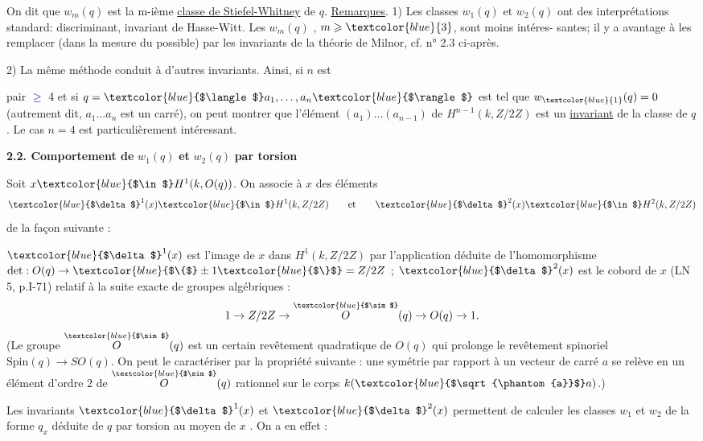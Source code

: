 \documentclass[11pt]{article}
\newcommand{\scanpage}[1]{\par\bigskip\noindent{\small\sffamily[scan #1]}\par}
\newcommand{\mspage}[1]{{\small\sffamily[p.\,#1]}}
\newcommand{\hand}[1]{\textcolor{blue}{#1}}
\newcommand{\uline}[1]{\underline{#1}}
\begin{document}
On dit que $w_m(q)$ est la m-ième \uline{classe de Stiefel-Whitney} de $q$.
\uline{Remarques}. 1) Les classes $w_1(q)$ et $w_2(q)$ ont des interprétations standard:
discriminant, invariant de Hasse-Witt. Les $w_m(q)$ , $m \geqslant \hand{3}$, sont moins intéres-%
santes; il y a avantage à les remplacer (dans la mesure du possible)
par les invariants de la théorie de Milnor, cf. n° 2.3 ci-après.

2) La même méthode conduit à d'autres invariants. Ainsi, si $n$ est

\mspage{\hand{289}}

\clearpage
\scanpage{119/290}
\mspage{- 3 -}

pair \hand{$\geq$} 4 et si $q = \hand{$\langle$} a_1,\dots,a_n \hand{$\rangle$}$ est tel que $w_{\hand{1}}(q) = 0$ (autrement dit,
$a_1\dots a_n$ est un carré), on peut montrer que l'élément $(a_1)\dots(a_{n-1})$ de
$H^{n-1}(k, Z/2Z)$ est un \uline{invariant} de la classe de $q$. Le cas $n = 4$ est
particulièrement intéressant.

\textbf{2.2. Comportement de} $w_1(q)$ \textbf{et} $w_2(q)$ \textbf{par torsion}

Soit $x \hand{$\in$} H^1(k, O(q))$. On associe à $x$ des éléments
\[ \hand{$\delta$}^1(x) \hand{$\in$} H^1(k,Z/2Z) \qquad\text{et}\qquad \hand{$\delta$}^2(x) \hand{$\in$} H^2(k,Z/2Z) \]
de la façon suivante :

$\hand{$\delta$}^1(x)$ est l'image de $x$ dans $H^1(k,Z/2Z)$ par l'application déduite
de l'homomorphisme $\det : O(q) \to \hand{$\{$} \pm 1 \hand{$\}$} = Z/2Z$ ;
$\hand{$\delta$}^2(x)$ est le cobord de $x$ (LN 5, p.I-71) relatif à la suite exacte
de groupes algébriques :
\[ 1 \to Z/2Z \to \overset{\hand{$\sim$}}{O}(q) \to O(q) \to 1 . \]
(Le groupe $\overset{\hand{$\sim$}}{O}(q)$ est un certain revêtement quadratique de $O(q)$ qui
prolonge le revêtement spinoriel $\mathrm{Spin}(q) \to SO(q)$. On peut le caractériser
par la propriété suivante : une symétrie par rapport à un vecteur de
carré $a$ se relève en un élément d'ordre 2 de $\overset{\hand{$\sim$}}{O}(q)$ rationnel sur
le corps $k(\hand{$\sqrt{\phantom{a}}$}a)$.)

Les invariants $\hand{$\delta$}^1(x)$ et $\hand{$\delta$}^2(x)$ permettent de calculer les classes
$w_1$ et $w_2$ de la forme $q_x$ déduite de $q$ par torsion au moyen de $x$ .
On a en effet :
\end{document}

